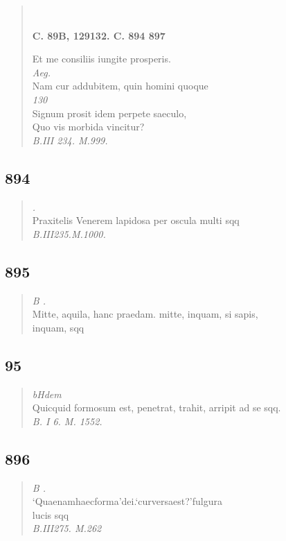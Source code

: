 \documentclass[11pt, a4paper]{report}
\begin{document}
\begin{verse}
        ﻿\pagebreak 
    \begin{center} \textbf{C. 89B, 129132. C. 894 897} \end{center} \marginpar{[339]} Et me consiliis iungite prosperis. \\ \textit{Aeg.} \\ Nam cur addubitem, quin homini quoque \\ \textit{130} \\ Signum prosit idem perpete saeculo, \\ Quo vis morbida vincitur? \\ \textit{B.III 234. M.999.} \\ 
      \end{verse}
  
            \subsection*{894}
      \begin{verse}
      \textit{.} \\ Praxitelis Venerem lapidosa per oscula multi sqq \\ \textit{B.III235.M.1000.} \\ 
      \end{verse}
  
            \subsection*{895}
      \begin{verse}
      \textit{B .} \\ Mitte, aquila, hanc praedam. mitte, inquam, si sapis, \\ inquam, sqq \\ 
      \end{verse}
  
            \subsection*{95}
      \begin{verse}
      \textit{bHdem} \\ Quicquid formosum est, penetrat, trahit, arripit ad se sqq. \\ \textit{B. I 6. M. 1552.} \\ 
      \end{verse}
  
            \subsection*{896}
      \begin{verse}
      \textit{B .} \\ ‘Quaenamhaecforma’dei.‘curversaest?’fulgura \\ lucis sqq \\ \textit{B.III275. M.262} \\ 
      \end{verse}
  
\end{document}
